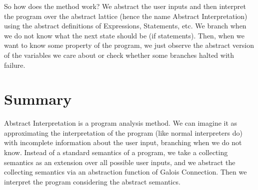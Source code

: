 So how does the method work?
We abstract the user inputs and then interpret the program over the abstract lattice (hence the name Abstract
Interpretation) using the abstract definitions of Expressions, Statements, etc.
We branch when we do not know what the next state should be (if statements).
Then, when we want to know some property of the program, we just observe the abstract version of the variables we care
about or check whether some branches halted with failure.

\section*{Summary}

Abstract Interpretation is a program analysis method.
We can imagine it as approximating the interpretation of the program (like normal interpreters do) with incomplete
information about the user input, branching when we do not know.
Instead of a standard semantics of a program, we take a collecting semantics as an extension over all possible user inputs,
and we abstract the collecting semantics via an abstraction function of Galois Connection.
Then we interpret the program considering the abstract semantics.
